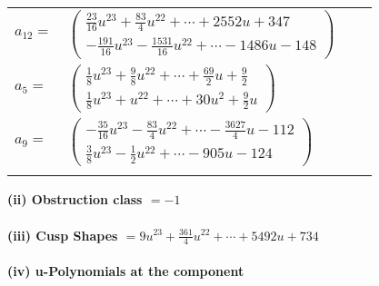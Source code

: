 \documentclass[1p]{elsarticle_modified}
\theoremstyle{definition}
\begin{document}
\begin{tabular}{m{7pt} m{180pt} m{7pt} m{180pt} }
\flushright $a_{12}=$&$\begin{pmatrix}\frac{23}{16} u^{23}+\frac{83}{4} u^{22}+\cdots+2552 u+347\\-\frac{191}{16} u^{23}-\frac{1531}{16} u^{22}+\cdots-1486 u-148\end{pmatrix}$ \\
\flushright $a_{5}=$&$\begin{pmatrix}\frac{1}{8} u^{23}+\frac{9}{8} u^{22}+\cdots+\frac{69}{2} u+\frac{9}{2}\\\frac{1}{8} u^{23}+u^{22}+\cdots+30 u^2+\frac{9}{2} u\end{pmatrix}$ \\
\flushright $a_{9}=$&$\begin{pmatrix}-\frac{35}{16} u^{23}-\frac{83}{4} u^{22}+\cdots-\frac{3627}{4} u-112\\\frac{3}{8} u^{23}-\frac{1}{2} u^{22}+\cdots-905 u-124\end{pmatrix}$\\&\end{tabular}
\flushleft \textbf{(ii) Obstruction class $= -1$}\\~\\
\flushleft \textbf{(iii) Cusp Shapes $= 9 u^{23}+\frac{361}{4} u^{22}+\cdots+5492 u+734$}\\~\\
\newpage\renewcommand{\arraystretch}{1}
\flushleft \textbf{(iv) u-Polynomials at the component}\newline \\
\end{document}
